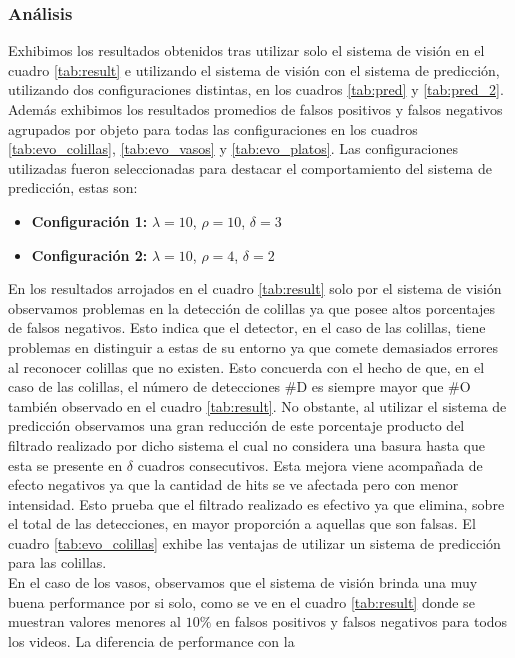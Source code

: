\subsubsection{Análisis}
Exhibimos los resultados obtenidos tras utilizar solo el sistema de 
visión en el cuadro \ref{tab:result} e utilizando el sistema de 
visión con el sistema de predicción, utilizando dos configuraciones 
distintas, en 
los cuadros \ref{tab:pred} y  \ref{tab:pred_2}. Además exhibimos los 
resultados promedios de falsos positivos y falsos negativos agrupados 
por objeto para todas las configuraciones en los cuadros \ref{tab:evo_colillas}, 
\ref{tab:evo_vasos} y \ref{tab:evo_platos}. Las configuraciones 
utilizadas fueron seleccionadas para destacar el comportamiento del 
sistema de predicción, estas son:
\begin{itemize}
\item{\textbf{Configuración 1:} $\lambda=10$, $\rho=10$, $\delta=3$}
\item{\textbf{Configuración 2:} $\lambda=10$, $\rho=4$, $\delta=2$}
\end{itemize}
\indent En los resultados arrojados en el cuadro \ref{tab:result} solo por el sistema de visión 
observamos problemas en la  detección de colillas ya que posee altos 
porcentajes de falsos negativos. Esto indica que el detector, en el 
caso de las colillas, tiene
problemas en distinguir a estas de su entorno ya que comete 
demasiados errores al reconocer colillas que no existen. Esto concuerda 
con el hecho de que, en el caso de las colillas, el número de 
detecciones \#D es siempre mayor que \#O también observado en el 
cuadro \ref{tab:result}. No obstante, al utilizar el sistema de 
predicción observamos una gran reducción de este porcentaje producto 
del filtrado realizado por dicho sistema el cual no considera una 
basura hasta que esta se presente en $\delta$ cuadros consecutivos.  
Esta mejora viene acompañada de efecto negativos ya que la cantidad de 
hits se ve afectada pero con menor intensidad. Esto prueba que el 
filtrado realizado es efectivo ya que elimina, sobre el total de las 
detecciones, en mayor proporción a 
aquellas que son falsas. El cuadro \ref{tab:evo_colillas} exhibe las ventajas de utilizar un sistema de 
predicción para las colillas.\\
\indent 
En el caso de los vasos, observamos que el sistema de visión brinda 
una muy buena performance por si solo, como se ve en el cuadro \ref{tab:result} 
donde se muestran valores menores al $10\%$ en falsos positivos y falsos 
negativos para todos los videos. La diferencia de performance con la 
